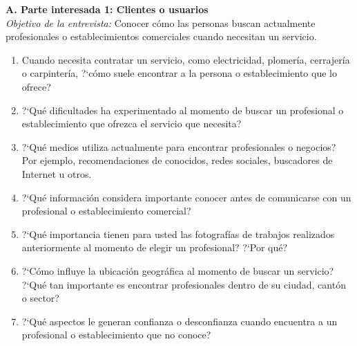 \documentclass[11pt,a4paper]{article}
\begin{document}
\vspace{3pt}
\noindent\textbf{A. Parte interesada 1: Clientes o usuarios}\\
\textit{Objetivo de la entrevista:} Conocer c\'omo las personas buscan actualmente profesionales o establecimientos comerciales cuando necesitan un servicio.
\begin{enumerate}[label=\textbf{\arabic*.}, leftmargin=1.8em, itemsep=1pt, topsep=2pt]
    \item Cuando necesita contratar un servicio, como electricidad, plomer\'ia, cerrajer\'ia o carpinter\'ia, ?`c\'omo suele encontrar a la persona o establecimiento que lo ofrece?
    \item ?`Qu\'e dificultades ha experimentado al momento de buscar un profesional o establecimiento que ofrezca el servicio que necesita?
    \item ?`Qu\'e medios utiliza actualmente para encontrar profesionales o negocios? Por ejemplo, recomendaciones de conocidos, redes sociales, buscadores de Internet u otros.
    \item ?`Qu\'e informaci\'on considera importante conocer antes de comunicarse con un profesional o establecimiento comercial?
    \item ?`Qu\'e importancia tienen para usted las fotograf\'ias de trabajos realizados anteriormente al momento de elegir un profesional? ?`Por qu\'e?
    \item ?`C\'omo influye la ubicaci\'on geogr\'afica al momento de buscar un servicio? ?`Qu\'e tan importante es encontrar profesionales dentro de su ciudad, cant\'on o sector?
    \item ?`Qu\'e aspectos le generan confianza o desconfianza cuando encuentra a un profesional o establecimiento que no conoce?
\end{enumerate}
\end{document}
